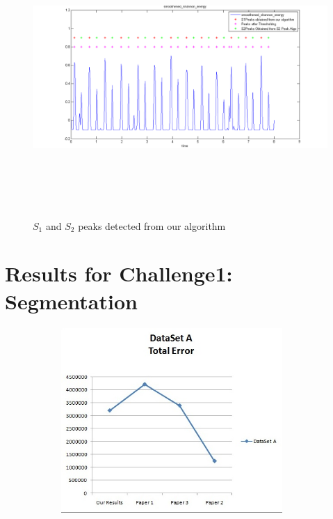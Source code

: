 \documentclass{article}
\begin{document}
\begin{figure}
\begin{center}
\includegraphics[width=500pt, height=300pt]{ATraining_8_Algo_S2Peaks_step3.png}
\caption{$S_1$ and $S_2$ peaks detected from our algorithm}
\end{center}
\end{figure}


\section{Results for Challenge1: Segmentation}


\begin{figure}
\begin{center}
\includegraphics[width=300pt, height=200pt]{TotalError-DataSetA.jpg}
\caption{}
\end{center}
\end{figure}
\end{document}

